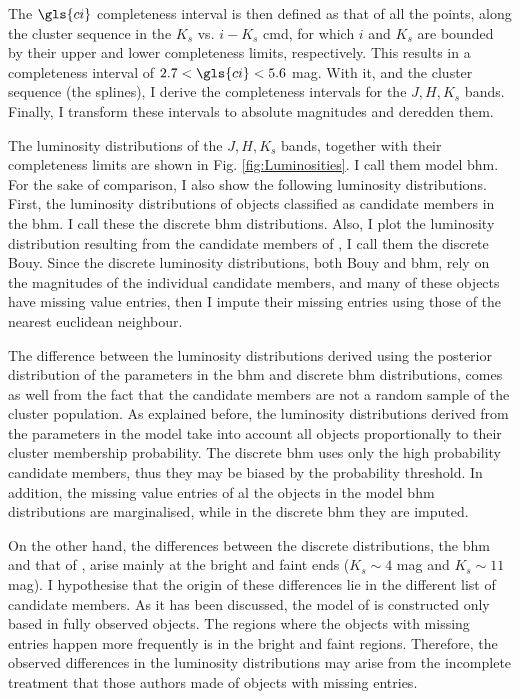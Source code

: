 The $\gls{ci}$ completeness interval is then defined as that of all the points, along the cluster sequence in the $K_s$ vs. $i-K_s$ \gls{cmd}, for which $i$ and $K_s$ are bounded by their upper and lower completeness limits, respectively. This results in a completeness interval of  $2.7<\gls{ci}<5.6$ mag. With it, and the cluster sequence (the splines), I derive the completeness intervals for the $J,H,K_s$ bands. Finally, I transform these intervals to absolute magnitudes and deredden them. 

The luminosity distributions of the $J,H,K_s$ bands, together with their completeness limits are shown in Fig. \ref{fig:Luminosities}. I call them model \gls{bhm}. For the sake of comparison, I also show the following luminosity distributions. First, the luminosity distributions of objects classified as candidate members in the \gls{bhm}. I call these the discrete \gls{bhm} distributions. Also, I plot the luminosity distribution resulting from the candidate members of \citet{Bouy2015}, I call them the discrete Bouy. Since the discrete luminosity distributions, both Bouy and \gls{bhm}, rely on the magnitudes of the individual candidate members, and many of these objects have missing value entries, then I impute their missing entries using those of the nearest euclidean neighbour. 

The difference between the luminosity distributions derived using the posterior distribution of the parameters in the \gls{bhm} and discrete \gls{bhm} distributions, comes as well from the fact that the candidate members are not a random sample of the cluster population. As explained before, the luminosity distributions derived from the parameters in the model take into account all objects proportionally to their cluster membership probability. The discrete \gls{bhm} uses only the high probability candidate members, thus they may be biased by the probability threshold. In addition, the missing value entries of al the objects in the model \gls{bhm} distributions are marginalised, while in the discrete \gls{bhm} they are imputed.
 
On the other hand, the differences between the discrete distributions, the \gls{bhm} and that of \citet{Bouy2015}, arise mainly at the bright and faint ends ($K_s\sim 4$ mag and $K_s\sim11$ mag). I hypothesise that the origin of these differences lie in the different list of candidate members. As it has been discussed, the model of \citet{Bouy2015} is constructed only based in fully observed objects. The regions where the objects with missing entries happen more frequently is in the bright and faint regions. Therefore, the observed differences in the luminosity distributions may arise from the incomplete treatment that those authors made of objects with missing entries.

